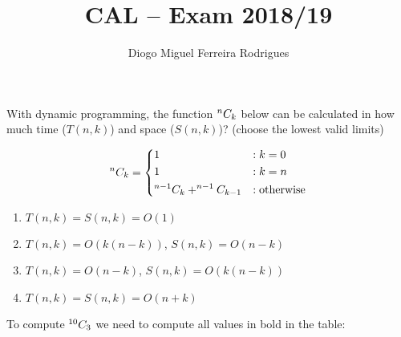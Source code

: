\documentclass{cal}
\title{CAL -- Exam 2018/19}
\author{Diogo Miguel Ferreira Rodrigues \\ \email{dmfrodrigues2000@gmail.com}}
\begin{document}
{
\renewcommand{\thechapter}{\arabic{chapter}N}
\setcounter{chapter}{18}


With dynamic programming, the function $^{n}C_{k}$ below can be calculated in how much time ($T(n,k)$) and space ($S(n,k)$)? (choose the lowest valid limits)

\begin{equation*}
    ^{n}C_{k} = \begin{dcases}
        1                               & : k = 0 \\
        1                               & : k = n \\
        ^{n-1}C_{k} + ^{n-1}C_{k-1} & : \text{otherwise}
    \end{dcases}
\end{equation*}

\begin{enumerate}[label=\Alph*)]\itemsep0em
    \item $T(n,k)=S(n,k)=O(1)$
    \item $T(n,k)=O(k(n-k))$, $S(n,k)=O(n-k)$ \greencheckmark
    \item $T(n,k)=O(n-k)$, $S(n,k)=O(k(n-k))$
    \item $T(n,k)=S(n,k)=O(n+k)$
\end{enumerate}
\ansseparator

To compute $^{10}C_{3}$ we need to compute all values in bold in the table:

}
\end{document}

